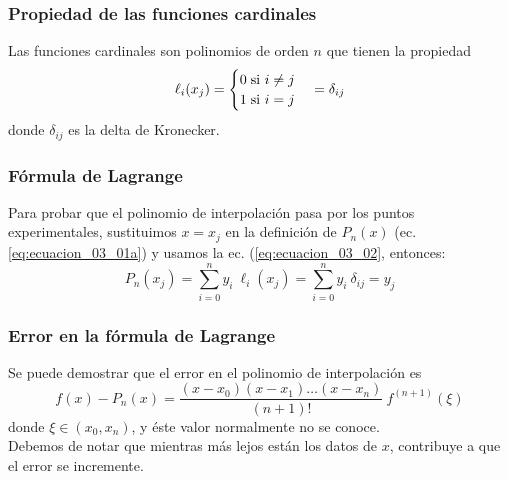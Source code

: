 \begin{frame}
\frametitle{Propiedad de las funciones cardinales}
Las funciones cardinales son polinomios de orden $n$ que tienen la propiedad
\begin{equation}
\ell_{i} (x_{j}) = \begin{cases} 0 \hspace{0.1cm} \mbox{si } i \neq j \\ 
1 \hspace{0.1cm} \mbox{si } i = j \end{cases} = \delta_{ij}
\label{eq:ecuacion_03_02}
\end{equation}
donde $\delta_{ij}$ es la delta de Kronecker.
\end{frame}
\begin{frame}
\frametitle{Fórmula de Lagrange}
Para probar que el polinomio de interpolación pasa por los puntos experimentales, sustituimos $x = x_{j}$ en la definición de $P_{n}(x)$ (ec. \ref{eq:ecuacion_03_01a}) y usamos la ec. (\ref{eq:ecuacion_03_02}, entonces:
\[ P_{n}(x_{j}) = \sum_{i = 0}^{n} y_{i} \: \ell_{i}(x_{j}) = \sum_{i = 0}^{n} y_{i} \: \delta_{ij} = y_{j} \]
\end{frame}
\begin{frame}
\frametitle{Error en la fórmula de Lagrange}
Se puede demostrar que el error en el polinomio de interpolación es
\[ f(x) - P_{n}(x) = \dfrac{(x - x_{0})(x - x_{1}) \ldots (x - x_{n})}{(n + 1)!} \: f^{(n+1)}(\xi)\]
donde $\xi \in (x_{0},x_{n})$, y éste valor normalmente no se conoce. 
\\
\bigskip
Debemos de notar que mientras más lejos están los datos de $x$, contribuye a que el error se incremente. 
\end{frame}

